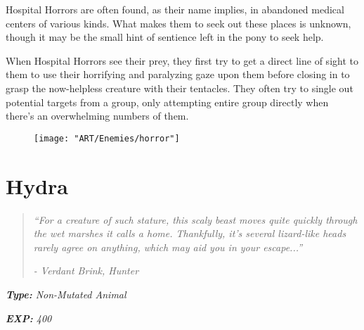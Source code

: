 \documentclass[11pt,a4paper,twocolumn]{book}
\begin{document}
	Hospital Horrors are often found, as their name implies, in abandoned medical centers of various kinds. What makes them to seek out these places is unknown, though it may be the small hint of sentience left in the pony to seek help.
	
	When Hospital Horrors see their prey, they first try to get a direct line of sight to them to use their horrifying and paralyzing gaze upon them before closing in to grasp the now-helpless creature with their tentacles. They often try to single out potential targets from a group, only attempting entire group directly when there's an overwhelming numbers of them.
	
	\begin{figure}[h]
		\centering
		\texttt{[image: "ART/Enemies/horror"]}
	\end{figure}
	
	\clearpage
	
	\section*{Hydra}
	\begin{quote}
		\emph{``For a creature of such stature, this scaly beast moves quite quickly through the wet marshes it calls a home. Thankfully, it's several lizard-like heads rarely agree on anything, which may aid you in your escape...''}
		
		\emph{-	Verdant Brink, Hunter}
	\end{quote}
	
	\noindent
	\emph{\textbf{Type:} Non-Mutated Animal}
	
	\noindent
	\emph{\textbf{EXP:} 400}
	
%		
%	
%		
\end{document}
